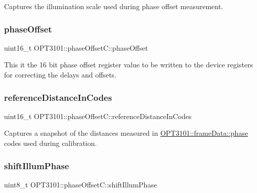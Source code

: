 Captures the illumination scale used during phase offset measurement. 

\mbox{\label{class_o_p_t3101_1_1phase_offset_c_addeef913546f1c431b4fd189478884f9}} 
\subsubsection{\texorpdfstring{phase\+Offset}{phaseOffset}}
{\footnotesize\ttfamily uint16\+\_\+t O\+P\+T3101\+::phase\+Offset\+C\+::phase\+Offset}



This it the 16 bit phase offset register value to be written to the device registers for correcting the delays and offsets. 

\mbox{\label{class_o_p_t3101_1_1phase_offset_c_ac77c406f9d3672254fa2b91e97a22d0c}} 
\subsubsection{\texorpdfstring{reference\+Distance\+In\+Codes}{referenceDistanceInCodes}}
{\footnotesize\ttfamily uint16\+\_\+t O\+P\+T3101\+::phase\+Offset\+C\+::reference\+Distance\+In\+Codes}



Captures a snapshot of the distances measured in \mbox{\hyperlink{class_o_p_t3101_1_1frame_data_af8661d11405953dc378ad4d7cb0f2db6}{O\+P\+T3101\+::frame\+Data\+::phase}} codes used during calibration. 

\mbox{\label{class_o_p_t3101_1_1phase_offset_c_a1977598d500c18fdd2ba58cbfd8789b9}} 
\subsubsection{\texorpdfstring{shift\+Illum\+Phase}{shiftIllumPhase}}
{\footnotesize\ttfamily uint8\+\_\+t O\+P\+T3101\+::phase\+Offset\+C\+::shift\+Illum\+Phase}



